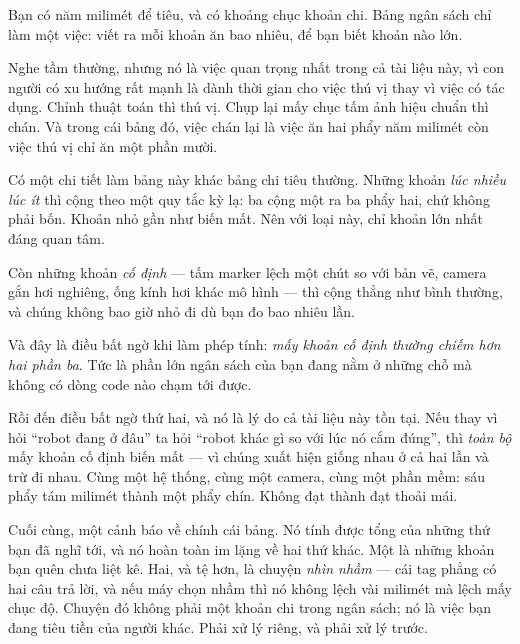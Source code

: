 \documentclass[../../marker.tex]{subfiles}
\begin{document}
\begin{traloi}
\end{traloi}

\begin{dongian}
Bạn có năm milimét để tiêu, và có khoảng chục khoản chi. Bảng ngân sách chỉ làm một việc: viết ra mỗi khoản ăn bao nhiêu, để bạn biết khoản nào lớn.

Nghe tầm thường, nhưng nó là việc quan trọng nhất trong cả tài liệu này, vì con người có xu hướng rất mạnh là dành thời gian cho việc thú vị thay vì việc có tác dụng. Chỉnh thuật toán thì thú vị. Chụp lại mấy chục tấm ảnh hiệu chuẩn thì chán. Và trong cái bảng đó, việc chán lại là việc ăn hai phẩy năm milimét còn việc thú vị chỉ ăn một phần mười.

Có một chi tiết làm bảng này khác bảng chi tiêu thường. Những khoản \emph{lúc nhiều lúc ít} thì cộng theo một quy tắc kỳ lạ: ba cộng một ra ba phẩy hai, chứ không phải bốn. Khoản nhỏ gần như biến mất. Nên với loại này, chỉ khoản lớn nhất đáng quan tâm.

Còn những khoản \emph{cố định} --- tấm marker lệch một chút so với bản vẽ, camera gắn hơi nghiêng, ống kính hơi khác mô hình --- thì cộng thẳng như bình thường, và chúng không bao giờ nhỏ đi dù bạn đo bao nhiêu lần.

Và đây là điều bất ngờ khi làm phép tính: \emph{mấy khoản cố định thường chiếm hơn hai phần ba}. Tức là phần lớn ngân sách của bạn đang nằm ở những chỗ mà không có dòng code nào chạm tới được.

Rồi đến điều bất ngờ thứ hai, và nó là lý do cả tài liệu này tồn tại. Nếu thay vì hỏi ``robot đang ở đâu'' ta hỏi ``robot khác gì so với lúc nó cắm đúng'', thì \emph{toàn bộ} mấy khoản cố định biến mất --- vì chúng xuất hiện giống nhau ở cả hai lần và trừ đi nhau. Cùng một hệ thống, cùng một camera, cùng một phần mềm: sáu phẩy tám milimét thành một phẩy chín. Không đạt thành đạt thoải mái.

Cuối cùng, một cảnh báo về chính cái bảng. Nó tính được tổng của những thứ bạn đã nghĩ tới, và nó hoàn toàn im lặng về hai thứ khác. Một là những khoản bạn quên chưa liệt kê. Hai, và tệ hơn, là chuyện \emph{nhìn nhầm} --- cái tag phẳng có hai câu trả lời, và nếu máy chọn nhầm thì nó không lệch vài milimét mà lệch mấy chục độ. Chuyện đó không phải một khoản chi trong ngân sách; nó là việc bạn đang tiêu tiền của người khác. Phải xử lý riêng, và phải xử lý trước.

\end{dongian}
\end{document}
